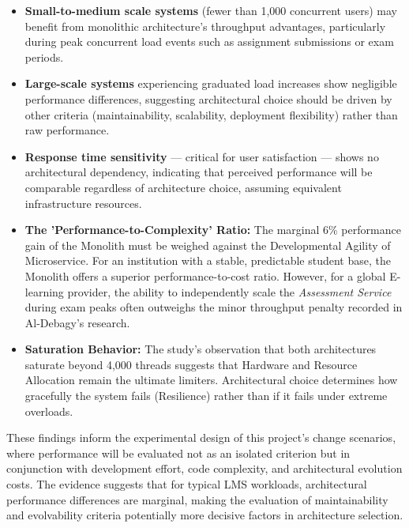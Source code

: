\begin{itemize}
    \item \textbf{Small-to-medium scale systems} (fewer than 1,000 concurrent users) may benefit from 
    monolithic architecture's throughput advantages, particularly during peak concurrent load events 
    such as assignment submissions or exam periods.
    
    \item \textbf{Large-scale systems} experiencing graduated load increases show negligible performance 
    differences, suggesting architectural choice should be driven by other criteria (maintainability, 
    scalability, deployment flexibility) rather than raw performance.
    
    \item \textbf{Response time sensitivity} — critical for user satisfaction — shows no architectural 
    dependency, indicating that perceived performance will be comparable regardless of architecture 
    choice, assuming equivalent infrastructure resources.
    
    \item \textbf{The 'Performance-to-Complexity' Ratio:} The marginal 6\% performance gain of the Monolith must 
    be weighed against the Developmental Agility of Microservice. For an institution 
    with a stable, predictable student base, the Monolith offers a superior performance-to-cost 
    ratio. However, for a global E-learning provider, the ability to independently scale 
    the \textit{Assessment Service} during exam peaks often outweighs the minor throughput penalty recorded in Al-Debagy’s research.

\item \textbf{Saturation Behavior:} The study's observation that both architectures saturate beyond 4,000 threads suggests that Hardware and Resource Allocation remain the ultimate limiters. Architectural choice determines how gracefully the system fails (Resilience) rather than if it fails under extreme overloads.

\end{itemize}

These findings inform the experimental design of this project's change scenarios, where performance 
will be evaluated not as an isolated criterion but in conjunction with development effort, code 
complexity, and architectural evolution costs. The evidence suggests that for typical LMS workloads, 
architectural performance differences are marginal, making the evaluation of maintainability and 
evolvability criteria  potentially more decisive factors in architecture selection.



